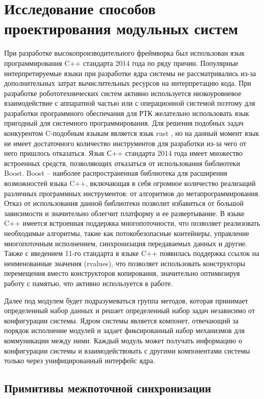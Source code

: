 \section{Исследование способов проектирования модульных систем}

При разработке высокопроизводительного фреймворка был использован язык программирования C++ стандарта 2014 года по ряду причин. Популярные интерпретируемые языки при разработке ядра системы не рассматривались из-за дополнительных затрат вычислительных ресурсов на интерпретацию кода. При разработке робототехнических систем активно используется низкоуровневое взаимодействие с аппаратной частью или с операционной системой поэтому для разработки программного обеспечания для РТК желательно использовать язык пригодный для системного программирования. Для решения подобных задач конкурентом C-подобным языкам является язык rust \cite{matsakis2014rust}, но на данный момент язык не имеет достаточного количество инструментов для разработки из-за чего от него пришлось отказаться. Язык С++ стандарта 2014 года имеет множество встроенных средств, позволяющих отказаться от использования библиотеки Boost. Boost – наиболее распространенная библиотека для расширения возможностей языка C++, включающая в себя огромное количество реализаций различных программных инструментов: от алгоритмов до метапрограммирования. Отказ от использования данной библиотеки позволит избавиться от большой зависимости и значительно облегчит платформу и ее развертывание. В языке C++ имеется встроенная поддержка многопоточности, что позволяет реализовать необходимые алгоритмы, такие как потокобезопасные контейнеры, управление многопоточным исполнением, синхронизация передаваемых данных и другие. Также с введением 11-го стандарта в языке C++ появилась поддержка ссылок на неименованные значения (rvalues), что позволяет использовать конструкторы перемещения вместо конструкторов копирования, значительно оптимизируя работу с памятью, что активно используется в работе.

Далее под модулем будет подразумеваться группа методов, которая принимает определенный набор данных и решает определенный набор задач независимо от конфигурации системы. Ядром системы является компонет, отвечающий за порядок исполнение модулей и задает фиксированный набор механизмов для коммуникации между ними. Каждый модуль может получать информацию о конфигурации системы и взаимодействовать с другими компонентами системы только через унифицированный интерфейс ядра.

\subsection{Примитивы межпоточной синхронизации}


